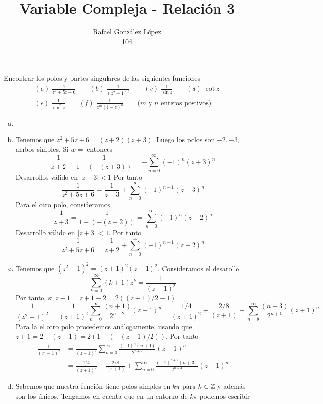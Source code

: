 \documentclass[twoside]{article}
\begin{document}
\title{Variable Compleja - Relación 3}
\author{Rafael González López\\
10d}
\maketitle
\begin{ejercicio}{1}
Encontrar los polos y partes singulares de las siguientes funciones
\begin{gather*}
(a)\; \frac{1}{z^2+5z+6} \qquad (b)\; \frac{1}{(z^2-1)^2} \qquad (c)\; \frac{1}{\sin z} \qquad (d)\; \cot z\\
(e)\; \frac{1}{\sin^2 z}\qquad (f)\; \frac{1}{z^m(1-z)^n} \qquad\text{($m$ y $n$ enteros postivos)}
\end{gather*}
\end{ejercicio}
\begin{solucion}
\begin{enumerate}[(a)]
\item[]
\item Tenemos que $z^2+5z+6=(z+2)(z+3)$. Luego los polos son $-2,-3$, ambos simples. Si $w=$ entonces
$$
\frac{1}{z+2}=\frac{1}{1-(-(z+3))} = - \sum_{n=0}^\infty (-1)^n(z+3)^n
$$
Desarrollos válido en $|z+3|<1$ Por tanto
$$
\frac{1}{z^2+5z+6} = \frac{1}{z-3} + \sum_{n=0}^\infty (-1)^{n+1}(z+3)^n
$$
Para el otro polo, consideramos
$$
\frac{1}{z+3} = \frac{1}{1-(-(z+2))} = \sum_{n=0}^\infty (-1)^n(z-2)^n
$$
Desarrollo válido en $|z+3|<1$. Por tanto
$$
\frac{1}{z^2+5z+6} = \frac{1}{z+2} + \sum_{n=0}^\infty (-1)^{n+1}(z+2)^n
$$
\newpage
\item Tenemos que $(z^2-1)^2 = (z+1)^2(z-1)^2$. Consideramos el desarollo
$$
\sum_{k=0}^\infty (k+1)z^k = \frac{1}{(z-1)^2}
$$
Por tanto, si $z-1 = z+1 -2 = {2((z+1)/2-1)}$
$$\frac{1}{(z^2-1)^2}=  \frac{1}{(z+1)^2} \sum_{n=0}^\infty\frac{(n+1)}{2^{n+2}}(z+1)^n = \frac{1/4}{(z+1)^{2}}+\frac{2/8}{(z+1)} + \sum_{n=0}^\infty \frac{(n+3)}{2^{n+4}}(z+1)^{n} 
$$
Para la el otro polo procedemos análogamente, usando que $z+1=2+(z-1) = 2(1-(-(z-1)/2))$. Por tanto
\begin{align*}
\frac{1}{(z^2-1)^2}&=  \frac{1}{(z-1)^2} \sum_{n=0}^\infty\frac{(-1)^n(n+1)}{2^{n+2}}(z-1)^n\\
&= \frac{1/4}{(z+1)^{2}}-\frac{2/8}{(z+1)} + \sum_{n=0}^\infty \frac{(-1)^{n+2}(n+3)}{2^{n+4}}(z+1)^{n}
\end{align*}
\item Sabemos que nuestra función tiene polos simples en $k\pi$ para $k\in \mathbb{Z}$ y además son los únicos.
Tengamos en cuenta que en un entorno de $k\pi$ podemos escribir

\end{enumerate}
\end{solucion}
\end{document}

